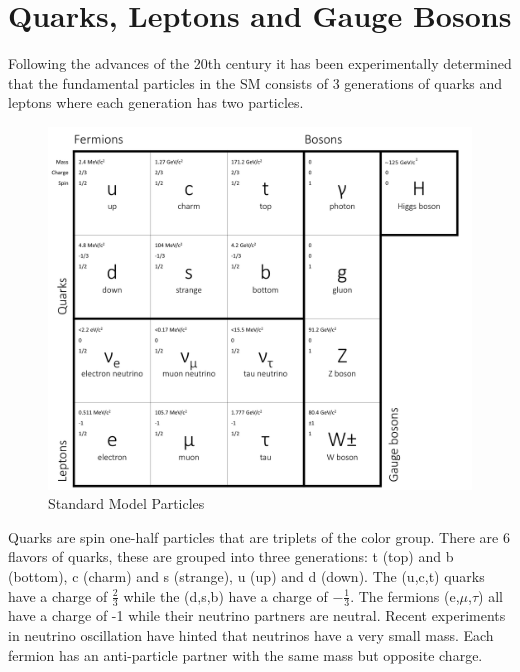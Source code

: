 \section{Quarks, Leptons and Gauge Bosons}%
Following the advances of the 20th century it has been experimentally 
determined that the fundamental
particles in the SM consists of 3 generations of quarks and leptons
where each generation has two particles. 
\begin{figure}[hb]
  \centering
	\includegraphics[width=\textwidth]{images/SMParticles2.png}
  	\caption[SM Particles]
   	{Standard Model Particles}
	\label{fig:SMParticles}
\end{figure}
Quarks are spin one-half particles that are triplets of the color group. 
There are 6 flavors of quarks, these are grouped into three generations:
t (top) and b (bottom), c (charm) and s (strange), u (up) and d (down). 
The (u,c,t) quarks have a charge of $\frac{2}{3}$ while the (d,s,b) have 
a charge of $-\frac{1}{3}$.
The fermions (e,$\mu$,$\tau$) all have a charge of -1 while their neutrino 
partners are neutral. Recent experiments in neutrino oscillation have hinted
that neutrinos have a very small mass.
Each fermion has an anti-particle partner with the same mass but opposite charge.

